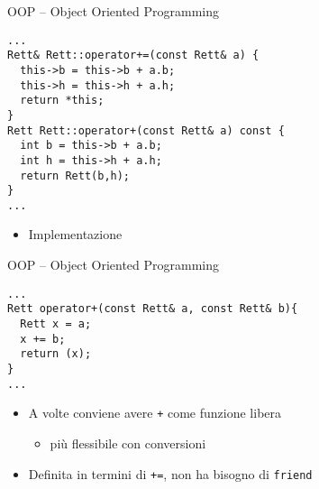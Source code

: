 \begin{frame}[fragile]{OOP -- Object Oriented Programming}
  \vfill
  \begin{lstlisting}[firstnumber=49]
...
Rett& Rett::operator+=(const Rett& a) {
  this->b = this->b + a.b;
  this->h = this->h + a.h;
  return *this;
}
Rett Rett::operator+(const Rett& a) const {
  int b = this->b + a.b;
  int h = this->h + a.h;
  return Rett(b,h);
}
...\end{lstlisting}
  \vfill
  \begin{itemize}
    \item Implementazione
  \end{itemize}
  \vfill
\end{frame}

\begin{frame}[fragile]{OOP -- Object Oriented Programming}
  \vfill
  \begin{lstlisting}[firstnumber=49]
...
Rett operator+(const Rett& a, const Rett& b){
  Rett x = a;
  x += b;
  return (x);
}
...\end{lstlisting}
  \vfill
  \begin{itemize}
    \item A volte conviene avere \lstinline$+$ come funzione libera
    \begin{itemize}
      \item più flessibile con conversioni
    \end{itemize}
    \vfill
    \item Definita in termini di \lstinline$+=$, \alert{non} ha bisogno di \lstinline$friend$
  \end{itemize}
  \vfill
\end{frame}
